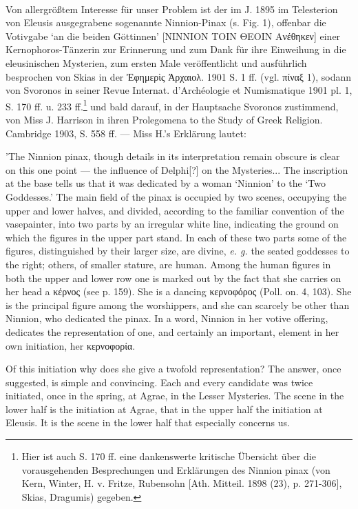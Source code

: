 \documentclass[a4paper, 11pt, oneside]{article}
\begin{document}
\paragraph{}
Von allergrößtem Interesse für unser Problem ist der im J. 1895 im Telesterion von Eleusis ausgegrabene sogenannte Ninnion-Pinax (s. Fig. 1), offenbar die Votivgabe `an die beiden Göttinnen' [ΝΙΝΝΙΟΝ ΤΟΙΝ ΘΕΟΙΝ Ανέθηκεν] einer Kernophoros-Tänzerin zur Erinnerung und zum Dank für ihre Einweihung in die eleusinischen Mysterien, zum ersten Male veröffentlicht und ausführlich besprochen von Skias in der Ἐφημερὶς Ἀρχαιολ. 1901 S. 1 ff. (vgl. πίναξ 1), sodann von Svoronos in seiner Revue Internat. d'Archéologie et Numismatique 1901 pl. 1, S. 170 ff. u. 233 ff.\footnote{Hier ist auch S. 170 ff. eine dankenswerte kritische Übersicht über die vorausgehenden Besprechungen und Erklärungen des Ninnion pinax (von Kern, Winter, H. v. Fritze, Rubensohn [Ath. Mitteil. 1898 (23), p. 271-306], Skias, Dragumis) gegeben.} und bald darauf, in der Hauptsache Svoronos zustimmend, von Miss J. Harrison in ihren Prolegomena to the Study of Greek Religion. Cambridge 1903, S. 558 ff. --- Miss H.'s Erklärung lautet:

'The Ninnion pinax, though details in its interpretation remain obscure is clear on this one point --- the influence of Delphi[?] on the Mysteries... The inscription at the base tells us that it was dedicated by a woman `Ninnion' to the `Two Goddesses.' The main field of the pinax is occupied by two scenes, occupying the upper and lower halves, and divided, according to the familiar convention of the vasepainter, into two parts by an irregular white line, indicating the ground on which the figures in the upper part stand. In each of these two parts some of the figures, distinguished by their larger size, are divine, \emph{e. g.} the seated goddesses to the right; others, of smaller stature, are human. Among the human figures in both the upper and lower row one is marked out by the fact that she carries on her head a κέρνος (see p. 159). She is a dancing κερνοφόρος (Poll. on. 4, 103). She is the principal figure among the worshippers, and she can scarcely be other than Ninnion, who dedicated the pinax. In a word, Ninnion in her votive offering, dedicates the representation of one, and certainly an important, element in her own initiation, her κερνοφορία.

Of this initiation why does she give a twofold representation? The answer, once suggested, is simple and convincing. Each and every candidate was twice initiated, once in the spring, at Agrae, in the Lesser Mysteries. The scene in the lower half is the initiation at Agrae, that in the upper half the initiation at Eleusis. It is the scene in the lower half that especially concerns us.
\end{document}
